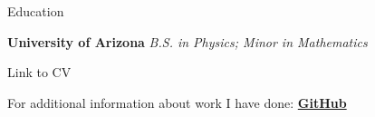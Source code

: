 \documentclass{resume} %
\begin{document}

\begin{rSection}{Education}
	
	{\bf University of Arizona} {\em B.S. in Physics; Minor in Mathematics} \\ 
	\nolinebreak	
	
\end{rSection}


\begin{rSection}{Link to CV}
	 
	For additional information about work I have done: \href{https://github.com/dfastje/resume/blob/master/CV/ExperienceNotes.md}{\bf GitHub} \\ 
	\nolinebreak	
	
\end{rSection}


%	
%




\end{document}
